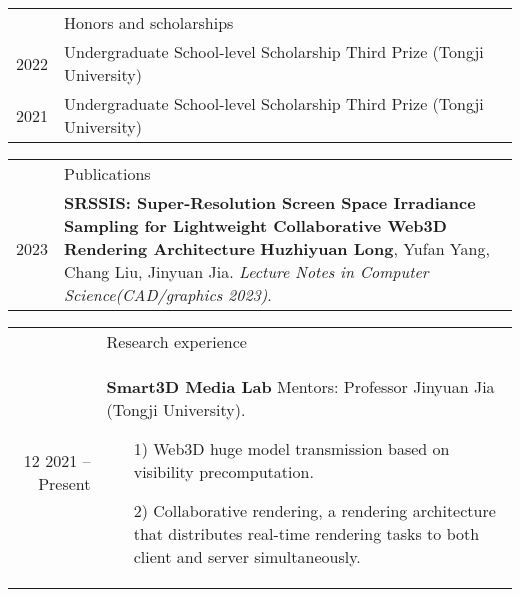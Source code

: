 \documentclass[letterpaper, 11pt]{article}
\newcommand{\headingfont}{\Large\color{OliveGreen}}
\newenvironment{SectionTable}[1]{
	\renewcommand*{\arraystretch}{1.7}
	\setlength{\tabcolsep}{10pt}
	\begin{longtable}{Rp{5.2in}} & #1 \\}
{\end{longtable}\vspace{-.3cm}}
\newenvironment{SectionTableSingleSpace}[1]{
	\renewcommand*{\arraystretch}{1.2}
	\setlength{\tabcolsep}{10pt}
	\begin{longtable}{Rp{5.2in}} & #1 \\[0.6em]}
{\end{longtable}\vspace{-.3cm}}
\begin{document}

\begin{SectionTableSingleSpace}{\headingfont Honors and scholarships}


    2022 &
    Undergraduate School-level Scholarship Third Prize (Tongji University) \\

    2021 &
    Undergraduate School-level Scholarship Third Prize (Tongji University)
\end{SectionTableSingleSpace}


\begin{SectionTable}{\headingfont Publications}
    2023 &
    \textbf{SRSSIS: Super-Resolution Screen Space Irradiance Sampling for Lightweight Collaborative Web3D Rendering Architecture} \newline
    \textbf{Huzhiyuan Long}, Yufan Yang, Chang Liu, Jinyuan Jia. \newline
    \textit{Lecture Notes in Computer Science(CAD/graphics 2023)}. \\


\end{SectionTable}


\begin{SectionTable}{\headingfont Research experience}
    12 2021 -- Present &
    \textbf{Smart3D Media Lab} \newline
    Mentors: Professor Jinyuan Jia (Tongji University). \newline
    \begin{itemize}
        \item [1)]
              Web3D huge model transmission based on visibility precomputation.
        \item [2)]
              Collaborative rendering, a rendering architecture that distributes real-time rendering tasks to both client and server simultaneously.
    \end{itemize} \\

\end{SectionTable}
\end{document}
